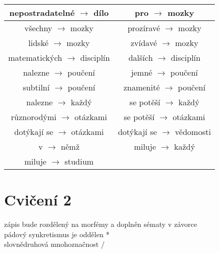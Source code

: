 \documentclass[12pt,a4paper]{article}
\theoremstyle{definition}
\begin{document}
\begin{tabular}{|c||c|}
\hline
nepostradateln\'{e} $ \rightarrow $ d\'{i}lo & pro  $\rightarrow $ mozky \\
\hline
v\v{s}echny $ \rightarrow $ mozky & proz\'{i}rav\'{e} $ \rightarrow $ mozky \\
\hline
lidsk\'{e} $ \rightarrow $ mozky & zv\'{i}dav\'{e}  $\rightarrow $ mozky \\
\hline
matematick\'{y}ch $ \rightarrow $ discipl\'{i}n & dal\v{s}\'{i}ch $ \rightarrow $ discipl\'{i}n \\
\hline
nalezne $ \rightarrow $ pou\v{c}en\'{i} & jemn\'{e} $ \rightarrow $ pou\v{c}en\'{i} \\
\hline
subtiln\'{i} $ \rightarrow $ pou\v{c}en\'{i} & znamenit\'{e} $ \rightarrow $ pou\v{c}en\'{i} \\
\hline
nalezne $ \rightarrow $ ka\v{z}d\'{y} & se pot\v{e}\v{s}\'{i} $ \rightarrow $ ka\v{z}d\'{y} \\
\hline
r\r{u}znorod\'{y}mi $ \rightarrow $ ot\'{a}zkami & se pot\v{e}\v{s}\'{i} $ \rightarrow $ ot\'{a}zkami \\
\hline
dot\'{y}kaj\'{i} se $ \rightarrow $ ot\'{a}zkami & dot\'{y}kaj\'{i} se $ \rightarrow $ v\v{e}domosti \\
\hline
v $ \rightarrow $ n\v{e}m\v{z} & miluje $ \rightarrow $ ka\v{z}d\'{y} \\
\hline
miluje $ \rightarrow $ studium & \\

\end{tabular}
\clearpage
\section{Cvi\v{c}en\'{i} 2 }
z\'{a}pis bude rozd\v{e}len\'{y} na morf\'{e}my a dopln\v{e}n s\'{e}maty v z\'{a}vorce \\
p\'{a}dov\'{y} synkretismus je odd\v{e}len * \\
slovn\v{e}druhov\'{a} mnohozna\v{c}nost / \\
\end{document}
